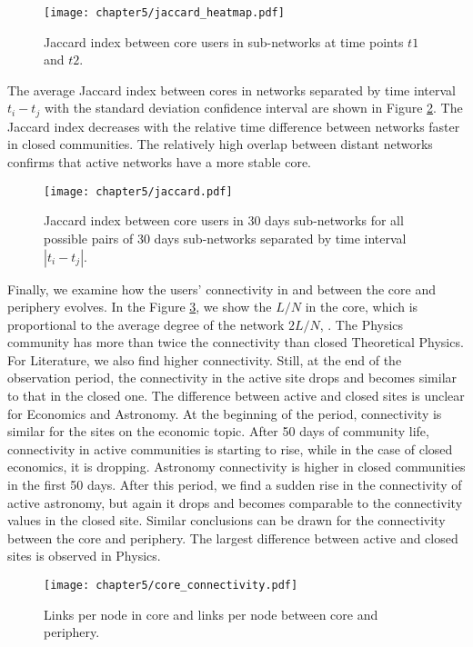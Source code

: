 \begin{figure}[h!]
	\centering
	\texttt{[image: chapter5/jaccard\_heatmap.pdf]}
	\caption[Mean Jaccard index between core users.]{Jaccard index between core users in  sub-networks at time points $t1$ and $t2$.}
	\label{fig:jaccard_hm}
\end{figure}  

The average Jaccard index between cores in networks separated by time interval $t_i-t_j$ with the standard deviation confidence interval are shown in Figure \ref{fig:jaccard_mean}. The Jaccard index decreases with the relative time difference between networks faster in closed communities. The relatively high overlap between distant networks confirms that active networks have a more stable core. 

\begin{figure}[h!]
	\centering
	\texttt{[image: chapter5/jaccard.pdf]}
	\caption[Mean Jaccard index between core users.]{Jaccard index between core users in 30 days sub-networks for all possible pairs of 30 days sub-networks separated by time interval $|t_i - t_j|$.}
	\label{fig:jaccard_mean}
\end{figure}

Finally, we examine how the users’ connectivity in and between the core and periphery evolves. In the Figure \ref{fig:links_per_node}, we show the $L/N$ in the core, which is proportional to the average degree of the network $2L/N$, . The Physics community has more than twice the connectivity than closed Theoretical Physics. For Literature, we also find higher connectivity. Still, at the end of the observation period, the connectivity in the active site drops and becomes similar to that in the closed one. The difference between active and closed sites is unclear for Economics and Astronomy. At the beginning of the period, connectivity is similar for the sites on the economic topic. After 50 days of community life, connectivity in active communities is starting to rise, while in the case of closed economics, it is dropping. Astronomy connectivity is higher in closed communities in the first 50 days. After this period, we find a sudden rise in the connectivity of active astronomy, but again it drops and becomes comparable to the connectivity values in the closed site. Similar conclusions can be drawn for the connectivity between the core and periphery. The largest difference between active and closed sites is observed in Physics.  

\begin{figure}[h]
	\centering
	\texttt{[image: chapter5/core\_connectivity.pdf]}
	\caption{Links per node in core and links per node between core and periphery.}
	\label{fig:links_per_node}
\end{figure}

